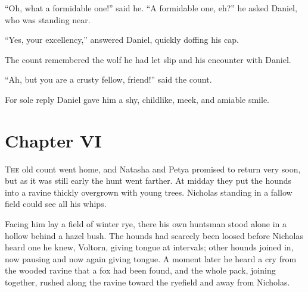 ``Oh, what a formidable one!'' said he. ``A formidable one, eh?''
he asked Daniel, who was standing near.

``Yes, your excellency,'' answered Daniel, quickly doffing his
cap.

The count remembered the wolf he had let slip and his encounter
with Daniel.

``Ah, but you are a crusty fellow, friend!'' said the count.

For sole reply Daniel gave him a shy, childlike, meek, and
amiable smile.


\chapter*{Chapter VI}
\ifaudio     
{} 
\fi

\lettrine[lines=2, loversize=0.3, lraise=0]{\initfamily T}{he}
old count went home, and Natasha and Petya promised to return
very soon, but as it was still early the hunt went farther. At
midday they put the hounds into a ravine thickly overgrown with
young trees.  Nicholas standing in a fallow field could see all
his whips.

Facing him lay a field of winter rye, there his own huntsman
stood alone in a hollow behind a hazel bush. The hounds had
scarcely been loosed before Nicholas heard one he knew, Voltorn,
giving tongue at intervals; other hounds joined in, now pausing
and now again giving tongue. A moment later he heard a cry from
the wooded ravine that a fox had been found, and the whole pack,
joining together, rushed along the ravine toward the ryefield and
away from Nicholas.

